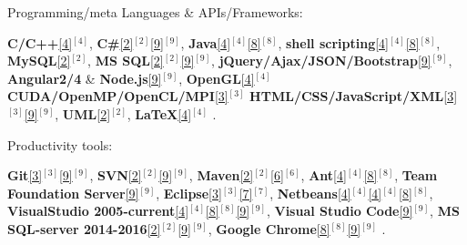 \begin{cventries}

  \cventry
    {Programming/meta Languages \& APIs/Frameworks:} %
    {} %
    {} %
    {} %
    {     
      \begin{cvitems} %
        \item {
        \textbf{C/C++}\ref{4}{$^{[4]}$}, 
        \textbf{C\#}\ref{2}{$^{[2]}$}\ref{9}{$^{[9]}$}, 
        \textbf{Java}\ref{4}{$^{[4]}$}\ref{8}{$^{[8]}$}, 
        \textbf{shell scripting}\ref{4}{$^{[4]}$}\ref{8}{$^{[8]}$}, 
        \textbf{MySQL}\ref{2}{$^{[2]}$}, 
        \textbf{MS SQL}\ref{2}{$^{[2]}$}\ref{9}{$^{[9]}$}, 
        \textbf{jQuery/Ajax/JSON/Bootstrap}\ref{9}{$^{[9]}$},  
        \textbf{Angular2/4} \& \textbf{Node.js}\ref{9}{$^{[9]}$},  
		\textbf{OpenGL}\ref{4}{$^{[4]}$}       
        \textbf{CUDA/OpenMP/OpenCL/MPI}\ref{3}{$^{[3]}$}
        \textbf{HTML/CSS/JavaScript/XML}\ref{3}{$^{[3]}$}\ref{9}{$^{[9]}$}, 
        \textbf{UML}\ref{2}{$^{[2]}$},
        \textbf{LaTeX}\ref{4}{$^{[4]}$}%
		.}
	  \end{cvitems}
    }  
  \vspace{-0.4cm}

  \cventry
    {Productivity tools:} %
    {} %
    {} %
    {} %
    {
      \begin{cvitems} %
        \item {
        \textbf{Git}\ref{3}{$^{[3]}$}\ref{9}{$^{[9]}$}, 
        \textbf{SVN}\ref{2}{$^{[2]}$}\ref{9}{$^{[9]}$}, 
        \textbf{Maven}\ref{2}{$^{[2]}$}\ref{6}{$^{[6]}$}, 
        \textbf{Ant}\ref{4}{$^{[4]}$}\ref{8}{$^{[8]}$}, 
        \textbf{Team Foundation Server}\ref{9}{$^{[9]}$}, 
        \textbf{Eclipse}\ref{3}{$^{[3]}$}\ref{7}{$^{[7]}$}, 
        \textbf{Netbeans}\ref{4}{$^{[4]}$}\ref{4}{$^{[4]}$}\ref{8}{$^{[8]}$}, 
        \textbf{VisualStudio 2005-current}\ref{4}{$^{[4]}$}\ref{8}{$^{[8]}$}\ref{9}{$^{[9]}$},
        \textbf{Visual Studio Code}\ref{9}{$^{[9]}$}, 
        \textbf{MS SQL-server 2014-2016}\ref{2}{$^{[2]}$}\ref{9}{$^{[9]}$},
        \textbf{Google Chrome}\ref{8}{$^{[8]}$}\ref{9}{$^{[9]}$}%
        .}       
      \end{cvitems}
    }  
  \vspace{-0.4cm}  
    

\end{cventries}
